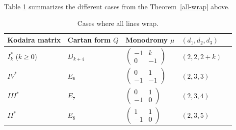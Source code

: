 Table \ref{wraptable} summarizes the different cases from the Theorem~\ref{all-wrap} above.

\begin{table}[h] \centering
 \begin{tabular}{ | l | l | l | l | l |}
 \hline
 Kodaira matrix & Cartan form $Q$ & Monodromy $\mu$ & $(d_1,d_2,d_3)$ \\ \hline
 $I^*_{k}$ ($k\geq 0$) & $D_{k+4}$ & 	 $\left(\begin{matrix}
		-1 &k \\
	 0 &-1
		\end{matrix}\right)$				& $(2,2,2+k)$ 	 \\ \hline
 $IV^*$ & $E_6$ & 		$\left(\begin{matrix}
		0 &1 \\
	 -1 &-1
		\end{matrix}\right)$		 & $(2,3,3)$	 \\ \hline
 $III^*$ &$E_7$ &	$\left(\begin{matrix}
		0 &1 \\
	 -1 &0
		\end{matrix}\right)$	 	 & $(2,3,4)$	 \\ \hline
 $II^*$ &$E_8$ & 	$\left(\begin{matrix}
		1 &1 \\
	 -1 &0
		\end{matrix}\right)$				& $(2,3,5)$		 \\ \hline
 \end{tabular}\caption{Cases where all lines wrap.}\label{wraptable}
 \end{table}

